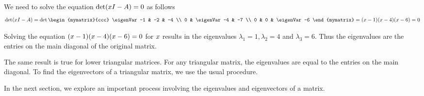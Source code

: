 \begin{solution}
We need to solve the equation $\det (x I - A) = 0$ as follows
\begin{eqnarray*}
\det (\eigenVar I - A) =
\det \begin{mymatrix}{ccc}
\eigenVar -1 & -2 & -4 \\
0 & \eigenVar-4 & -7 \\
0 & 0 & \eigenVar-6
\end{mymatrix} =(\eigenVar-1) (\eigenVar-4) (\eigenVar-6) =0
\end{eqnarray*}

Solving the equation $(x-1) (x-4
) (x-6) = 0$ for $x$ results in the eigenvalues 
$\lambda_1 = 1, \lambda_2 = 4$ and $\lambda_3 = 6$.  Thus the
eigenvalues are the entries on the main diagonal of the original
matrix.
\end{solution}

The same result is true for lower triangular matrices. For any triangular matrix,
the eigenvalues are equal to the entries on the main diagonal. To find the 
eigenvectors of a triangular matrix, we use the usual procedure. 

In the next section, we explore an important process involving the eigenvalues and eigenvectors of a matrix. 
